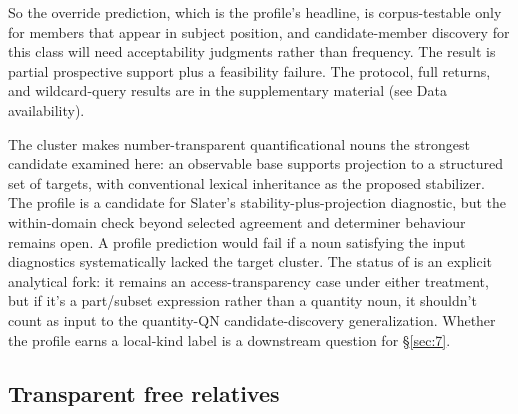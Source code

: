 So the override prediction, which is the profile's headline, is corpus-testable only for members that appear in subject position, and candidate-member discovery for this class will need acceptability judgments rather than frequency. The  result is partial prospective support plus a feasibility failure. The protocol, full returns, and wildcard-query results are in the supplementary material (see Data availability).

The cluster makes number-transparent quantificational nouns the strongest candidate  examined here: an observable base supports projection to a structured set of targets, with conventional lexical inheritance as the proposed stabilizer. The profile is a candidate for Slater's \autocite*{slater-2015-natural-kindness} stability-plus-projection diagnostic, but the within-domain check beyond selected agreement and determiner behaviour remains open. A profile prediction would fail if a noun satisfying the input diagnostics systematically lacked the target cluster. The status of  is an explicit analytical fork: it remains an access-transparency case under either treatment, but if it's a part/subset expression rather than a quantity noun, it shouldn't count as input to the quantity-QN candidate-discovery generalization. Whether the profile earns a local-kind label is a downstream question for §\ref{sec:7}.

\subsection{Transparent free relatives}\label{sec:2-5}

